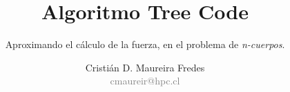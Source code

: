 \documentclass{beamer}
\author[Cristián D. Maureira Fredes]{\large Cristián D. Maureira Fredes\\\normalsize \textcolor{gray}{cmaureir@hpc.cl}}
\title[Algoritmo Tree Code]{\Huge Algoritmo Tree Code}
\subtitle{Aproximando el cálculo de la fuerza, en el problema de \emph{n-cuerpos}.}
\institute{Universidad Técnica\\ Federico Santa María}
\begin{document}
\begin{frame}[t,plain]
\titlepage
\end{frame}



\begin{frame}[t,plain]
\titlepage
\end{frame}
\end{document}
